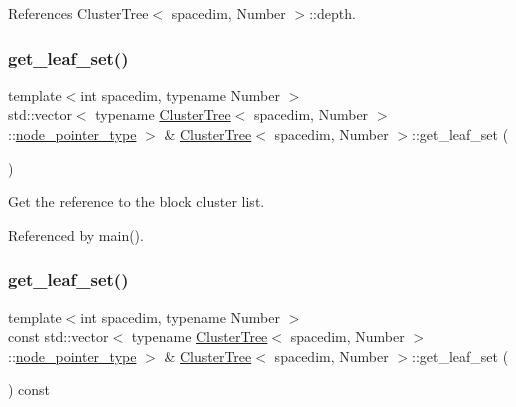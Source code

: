 References Cluster\+Tree$<$ spacedim, Number $>$\+::depth.

\mbox{\label{classClusterTree_af17a96da7f2e5391d3e49028b2aba894}} 
\subsubsection{\texorpdfstring{get\+\_\+leaf\+\_\+set()}{get\_leaf\_set()}\hspace{0.1cm}{\footnotesize\ttfamily [1/2]}}
{\footnotesize\ttfamily template$<$int spacedim, typename Number $>$ \\
std\+::vector$<$ typename \hyperlink{classClusterTree}{Cluster\+Tree}$<$ spacedim, Number $>$\+::\hyperlink{classClusterTree_ae4bb0fdc7ac559d7844d04a00ab3e9de}{node\+\_\+pointer\+\_\+type} $>$ \& \hyperlink{classClusterTree}{Cluster\+Tree}$<$ spacedim, Number $>$\+::get\+\_\+leaf\+\_\+set (\begin{DoxyParamCaption}{ }\end{DoxyParamCaption})}

Get the reference to the block cluster list. 

Referenced by main().

\mbox{\label{classClusterTree_afbf8f03d5f34305d3c34ae4c360f50ae}} 
\subsubsection{\texorpdfstring{get\+\_\+leaf\+\_\+set()}{get\_leaf\_set()}\hspace{0.1cm}{\footnotesize\ttfamily [2/2]}}
{\footnotesize\ttfamily template$<$int spacedim, typename Number $>$ \\
const std\+::vector$<$ typename \hyperlink{classClusterTree}{Cluster\+Tree}$<$ spacedim, Number $>$\+::\hyperlink{classClusterTree_ae4bb0fdc7ac559d7844d04a00ab3e9de}{node\+\_\+pointer\+\_\+type} $>$ \& \hyperlink{classClusterTree}{Cluster\+Tree}$<$ spacedim, Number $>$\+::get\+\_\+leaf\+\_\+set (\begin{DoxyParamCaption}{ }\end{DoxyParamCaption}) const}

